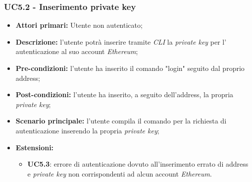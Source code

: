 \subsubsection{UC5.2 - Inserimento private key\glo}
\begin{itemize}
	\item \textbf{Attori primari:} Utente non autenticato;
	\item \textbf{Descrizione:} l'utente potrà inserire tramite \textit{CLI} la \textit{private key\glo} per l' autenticazione al suo account \textit{Ethereum\glos}; 
	\item \textbf{Pre-condizioni:} l'utente ha inserito il comando "login" seguito dal proprio address;
	\item \textbf{Post-condizioni:} l'utente ha inserito, a seguito dell'address, la propria \textit{private key\glos};
	\item \textbf{Scenario principale:} l'utente compila il comando per la richiesta di autenticazione inserendo la propria \textit{private key\glos};
	\item \textbf{Estensioni:} 
	\begin{itemize}
		\item \textbf{UC5.3}: errore di autenticazione dovuto all'inserimento errato di address e \textit{private key\glo} non corrispondenti ad alcun account \textit{Ethereum\glos}.
	\end{itemize}
\end{itemize}